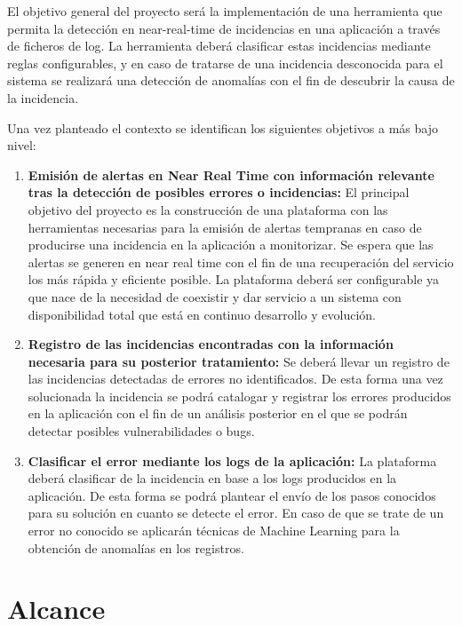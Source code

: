 El objetivo general del proyecto será la implementación de una herramienta que permita la detección en near-real-time de incidencias en una aplicación a través de ficheros de log. La herramienta deberá clasificar estas incidencias mediante reglas configurables, y en caso de tratarse de una incidencia desconocida para el sistema se realizará una detección de anomalías con el fin de descubrir la causa de la incidencia.

Una vez planteado el contexto se identifican los siguientes objetivos a más bajo nivel:

\begin{enumerate}
	\item \textbf{Emisión de alertas en Near Real Time con información relevante tras la detección de posibles errores o incidencias:} El principal objetivo del proyecto es la construcción de una plataforma con las herramientas necesarias para la emisión de alertas tempranas en caso de producirse una incidencia en la aplicación a monitorizar. Se espera que las alertas se generen en near real time con el fin de una recuperación del servicio los más rápida y eficiente posible. La plataforma deberá ser configurable ya que nace de la necesidad de coexistir y dar servicio a un sistema con disponibilidad total que está en continuo desarrollo y evolución.
	
	\item \textbf{Registro de las incidencias encontradas con la información necesaria para su posterior tratamiento:} Se deberá llevar un registro de las incidencias detectadas de errores no identificados. De esta forma una vez solucionada la incidencia se podrá catalogar y registrar los errores producidos en la aplicación con el fin de un análisis posterior en el que se podrán detectar posibles vulnerabilidades o bugs.
	
	\item \textbf{Clasificar el error mediante los logs de la aplicación:} La plataforma deberá clasificar de la incidencia en base a los logs producidos en la aplicación. De esta forma se podrá plantear el envío de los pasos conocidos para su solución en cuanto se detecte el error. En caso de que se trate de un error no conocido se aplicarán técnicas de Machine Learning para la obtención de anomalías en los registros.
\end{enumerate}
	


\section{Alcance}

